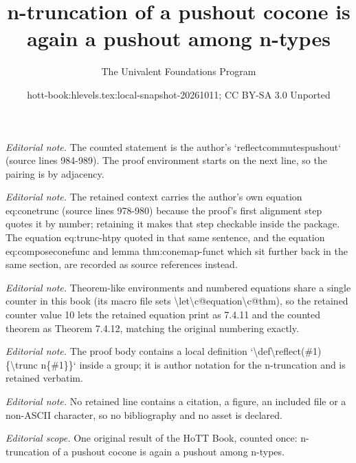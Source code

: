 \documentclass[10pt,a4paper]{article}
\title{n-truncation of a pushout cocone is again a pushout among n-types}
\author{The Univalent Foundations Program}
\date{hott-book:hlevels.tex:local-snapshot-20261011; CC BY-SA 3.0 Unported}
\newcounter{chapter}
\theoremstyle{definition}
\theoremstyle{remark}
\numberwithin{equation}{section}
\begin{document}
\maketitle
\setcounter{chapter}{7}
\setcounter{section}{4}
\setcounter{thm}{10}
\noindent\textit{Editorial note.} The counted statement is the author's `reflectcommutespushout` (source lines 984-989). The proof environment starts on the next line, so the pairing is by adjacency.\par\medskip
\noindent\textit{Editorial note.} The retained context carries the author's own equation eq:conetrunc (source lines 978-980) because the proof's first alignment step quotes it by number; retaining it makes that step checkable inside the package. The equation eq:trunc-htpy quoted in that same sentence, and the equation eq:composeconefunc and lemma thm:conemap-funct which sit further back in the same section, are recorded as source references instead.\par\medskip
\noindent\textit{Editorial note.} Theorem-like environments and numbered equations share a single counter in this book (its macro file sets \textbackslash{}let\textbackslash{}c@equation\textbackslash{}c@thm), so the retained counter value 10 lets the retained equation print as 7.4.11 and the counted theorem as Theorem 7.4.12, matching the original numbering exactly.\par\medskip
\noindent\textit{Editorial note.} The proof body contains a local definition `\textbackslash{}def\textbackslash{}reflect(\#1)\{\textbackslash{}trunc n\{\#1\}\}` inside a group; it is author notation for the n-truncation and is retained verbatim.\par\medskip
\noindent\textit{Editorial note.} No retained line contains a citation, a figure, an included file or a non-ASCII character, so no bibliography and no asset is declared.\par\medskip
\noindent\textit{Editorial scope.} One original result of the HoTT Book, counted once: n-truncation of a pushout cocone is again a pushout among n-types.\par\medskip
\end{document}
